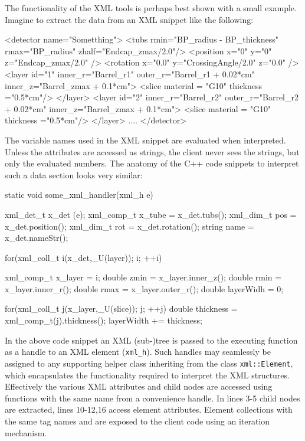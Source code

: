 \documentclass[10pt,a4paper]{article}
\begin{document}
\noindent 
The functionality of the XML tools is perhaps best shown with a small example.
Imagine to extract the data from an XML snippet like the following:
\begin{code}
  <detector name="Sometthing">
    <tubs rmin="BP_radius - BP_thickness" rmax="BP_radius" zhalf="Endcap_zmax/2.0"/>
    <position x="0" y="0" z="Endcap_zmax/2.0" />
    <rotation x="0.0" y="CrossingAngle/2.0" z="0.0" />
    <layer id="1" inner_r="Barrel_r1" 
    	   outer_r="Barrel_r1 + 0.02*cm" inner_z="Barrel_zmax + 0.1*cm">
      <slice material = "G10" thickness ="0.5*cm"/>
    </layer>
    <layer id="2" inner_r="Barrel_r2" 
	   outer_r="Barrel_r2 + 0.02*cm" inner_z="Barrel_zmax + 0.1*cm">
     <slice material = "G10" thickness ="0.5*cm"/>
    </layer>
    ....
  </detector>
\end{code}

The variable names used in the XML snippet are evaluated when interpreted.
Unless the attributes are accessed as strings, the client never sees the 
strings, but only the evaluated numbers.
The anatomy of the C++ code snippets to interpret such a data section 
looks very similar:
\begin{code}
  static void some_xml_handler(xml_h e)  {
    xml_det_t  x_det  (e);
    xml_comp_t x_tube    = x_det.tubs();
    xml_dim_t  pos       = x_det.position();
    xml_dim_t  rot       = x_det.rotation();
    string     name      = x_det.nameStr();
      
    for(xml_coll_t i(x_det,_U(layer)); i; ++i)  {
      xml_comp_t x_layer = i;
      double  zmin = x_layer.inner_z();
      double  rmin = x_layer.inner_r();
      double  rmax = x_layer.outer_r();
      double  layerWidh = 0;
        
      for(xml_coll_t j(x_layer,_U(slice)); j; ++j)  {
        double thickness = xml_comp_t(j).thickness();
        layerWidth += thickness;
      }
    }
  }
\end{code}
In the above code snippet an XML (sub-)tree is passed to the executing 
function as a handle to an XML element ({\tt{xml\_h}}). Such handles may seamlessly be
assigned to any supporting helper class inheriting from the
class {\tt{xml::Element}}, which encapsulates the functionality required to 
interpret the XML structures.
Effectively the various XML attributes and child nodes 
are accessed using functions with the same
name from a convenience handle. 
In lines 3-5 child nodes are extracted, lines 10-12,16 access element attributes.
Element collections with the same tag names  and  are exposed
to the client code using an iteration mechanism.
\end{document}
